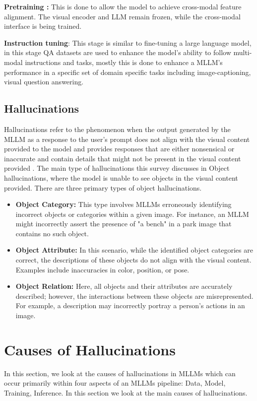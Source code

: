 \documentclass[twocolumn, 9pt]{extarticle}
\begin{document}
\textbf{Pretraining :} This is done to allow the model to achieve cross-modal feature alignment. The visual encoder and LLM remain frozen, while the cross-modal interface is being trained. 

\textbf{Instruction tuning}: This stage is similar to fine-tuning a large language model, in this stage QA datasets are used to enhance the model’s ability to follow multi-modal instructions and tasks, mostly this is done to enhance a MLLM’s performance in a specific set of domain specific tasks including image-captioning, visual question answering. 

\subsection{Hallucinations}
Hallucinations refer to the phenomenon when the output generated by the MLLM as a response to the user’s prompt does not align with the visual content provided to the model and provides responses that are either nonsensical or inaccurate and contain details that might not be present in the visual content provided . The main type of hallucinations this survey discusses in Object hallucinations, where the model is unable to see objects in the visual content provided. There are three primary types of object hallucinations. 

\begin{itemize}
    \item \textbf{Object Category:} This type involves MLLMs erroneously identifying incorrect objects or categories within a given image. For instance, an MLLM might incorrectly assert the presence of "a bench" in a park image that contains no such object.
    \item \textbf{Object Attribute:} In this scenario, while the identified object categories are correct, the descriptions of these objects do not align with the visual content. Examples include inaccuracies in color, position, or pose.
    \item \textbf{Object Relation:} Here, all objects and their attributes are accurately described; however, the interactions between these objects are misrepresented. For example, a description may incorrectly portray a person's actions in an image.
\end{itemize}

\section{Causes of Hallucinations}
In this section, we look at the causes of hallucinations in MLLMs which can occur primarily within four aspects of an MLLMs pipeline: Data, Model, Training, Inference. In this section we look at the main causes of hallucinations. 
\end{document}

